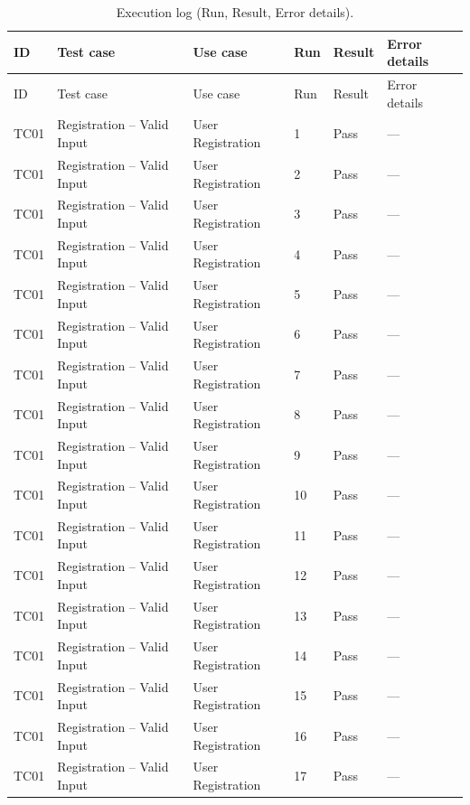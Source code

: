 {\scriptsize
\setlength{\tabcolsep}{4pt}
\begin{longtable}{@{}p{1.2cm} p{4.2cm} p{4.4cm} p{0.8cm} p{0.9cm} p{1.6cm}@{}}
  \caption{Execution log (Run, Result, Error details).\label{tab:execution-log}}\\
  \toprule
  ID & Test case & Use case & Run & Result & Error details \\
  \midrule
  \endfirsthead
  \toprule
  ID & Test case & Use case & Run & Result & Error details \\
  \midrule
  \endhead
  \bottomrule
  \endlastfoot
  TC01 & Registration -- Valid Input & User Registration & 1 & Pass & --- \\
  TC01 & Registration -- Valid Input & User Registration & 2 & Pass & --- \\
  TC01 & Registration -- Valid Input & User Registration & 3 & Pass & --- \\
  TC01 & Registration -- Valid Input & User Registration & 4 & Pass & --- \\
  TC01 & Registration -- Valid Input & User Registration & 5 & Pass & --- \\
  TC01 & Registration -- Valid Input & User Registration & 6 & Pass & --- \\
  TC01 & Registration -- Valid Input & User Registration & 7 & Pass & --- \\
  TC01 & Registration -- Valid Input & User Registration & 8 & Pass & --- \\
  TC01 & Registration -- Valid Input & User Registration & 9 & Pass & --- \\
  TC01 & Registration -- Valid Input & User Registration & 10 & Pass & --- \\
  TC01 & Registration -- Valid Input & User Registration & 11 & Pass & --- \\
  TC01 & Registration -- Valid Input & User Registration & 12 & Pass & --- \\
  TC01 & Registration -- Valid Input & User Registration & 13 & Pass & --- \\
  TC01 & Registration -- Valid Input & User Registration & 14 & Pass & --- \\
  TC01 & Registration -- Valid Input & User Registration & 15 & Pass & --- \\
  TC01 & Registration -- Valid Input & User Registration & 16 & Pass & --- \\
  TC01 & Registration -- Valid Input & User Registration & 17 & Pass & --- \\

\end{longtable}}
